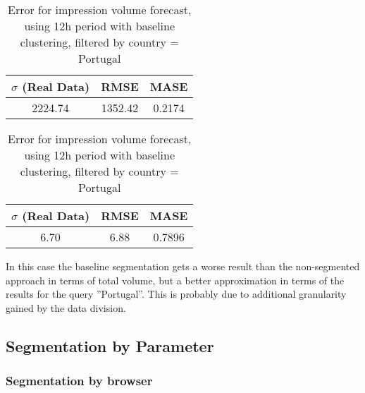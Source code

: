 \begin{table}[!ht]
\centering
\footnotesize
\begin{minipage}[t]{0.45\linewidth}
\centering
\footnotesize
\begin{tabular}{ccc}
 $\sigma$ (Real Data) & RMSE & MASE   \\ \hline
2224.74 & 1352.42 & 0.2174 \\
\end{tabular}

\vspace{0.5cm}

\caption[Volume
impression forecast, baseline]{Error for volume impression forecast, using 12h
period with baseline clustering}
\label{tab:err_forecast_12_real_data_baseline}
\end{minipage}
\quad
\begin{minipage}[t]{0.45\linewidth}
\centering
\footnotesize
\begin{tabular}{ccc}
 $\sigma$ (Real Data) & RMSE & MASE   \\ \hline
6.70 & 6.88 & 0.7896 \\
\end{tabular}

\vspace{0.5cm}

\caption[Volume
impression forecast, safari]{Error for impression volume
forecast, using 12h period with baseline clustering, filtered by country =
Portugal}
\label{tab:err_forecast_12_real_data_baseline_filtered}
\end{minipage}

\end{table}

In this case the baseline segmentation gets a worse result than the
non-segmented approach in terms of total volume, but a better approximation
in terms of the results for the query ''Portugal''. This is probably due to additional
granularity gained by the data division.


\subsection*{Segmentation by Parameter}

\subsubsection*{Segmentation by browser}


